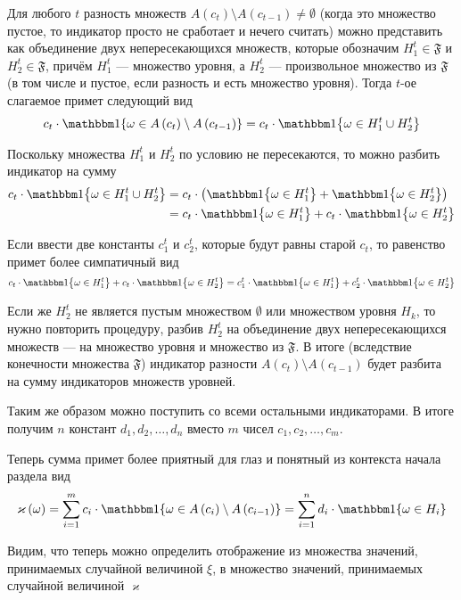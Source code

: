 Для любого $t$ разность множеств
$A\left( c_{t} \right) \setminus A\left( c_{t-1} \right) \neq \emptyset$
(когда это множество пустое, то индикатор просто не сработает и нечего считать)
можно представить как объединение двух непересекающихся множеств,
которые обозначим $H_1^t \in \mathfrak{F}$ и $H_2^t \in \mathfrak{F}$,
причём $H_1^t$ --- множество уровня, а $H_2^t$ --- произвольное множество
из $\mathfrak{F}$ (в том числе и пустое, если разность и есть множество уровня).
Тогда $t$-ое слагаемое примет следующий вид
$$c_t \cdot \Indicator{\omega \in
  A\left( c_{t} \right) \setminus A\left( c_{t-1} \right)}
  = c_t \cdot \Indicator{\omega \in H_1^t \cup H_2^t}$$

Поскольку множества $H_1^t$ и $H_2^t$ по условию не пересекаются,
то можно разбить индикатор на сумму
\begin{align*}
c_t \cdot \Indicator{\omega \in H_1^t \cup H_2^t}
  &= c_t \cdot \left( \Indicator{\omega \in H_1^t}
      + \Indicator{\omega \in H_2^t} \right) \\
  &= c_t \cdot \Indicator{\omega \in H_1^t}
      + c_t \cdot \Indicator{\omega \in H_2^t}
\end{align*}

Если ввести две константы $c_1^t$ и $c_2^t$, которые будут равны старой $c_t$,
то равенство примет более симпатичный вид
$$c_t \cdot \Indicator{\omega \in H_1^t}
  + c_t \cdot \Indicator{\omega \in H_2^t}
  = c_1^t \cdot \Indicator{\omega \in H_1^t}
  + c_2^t \cdot \Indicator{\omega \in H_2^t}$$

Если же $H_2^t$ не является пустым множеством $\emptyset$
или множеством уровня $H_k$, то нужно повторить процедуру,
разбив $H_2^t$ на объединение двух непересекающихся множеств --- на множество
уровня и множество из $\mathfrak{F}$.
В итоге (вследствие конечности множества $\mathfrak{F}$)
индикатор разности $A\left( c_{t} \right) \setminus A\left( c_{t-1} \right)$
будет разбита на сумму индикаторов множеств уровней.

Таким же образом можно поступить со всеми остальными индикаторами.
В итоге получим $n$ констант $d_1, d_2, \dots, d_n$
вместо $m$ чисел $c_1, c_2, \dots, c_m$.

Теперь сумма примет более приятный для глаз
и понятный из контекста начала раздела вид
$$\varkappa\left( \omega \right)
  = \sum_{i=1}^m c_i \cdot \Indicator{\omega
      \in A\left( c_{i} \right) \setminus A\left( c_{i-1} \right)}
  = \sum_{i=1}^n d_i \cdot \Indicator{\omega \in H_i}$$

Видим, что теперь можно определить отображение из множества значений,
принимаемых случайной величиной $\xi$, в множество значений,
принимаемых случайной величиной $\varkappa$

